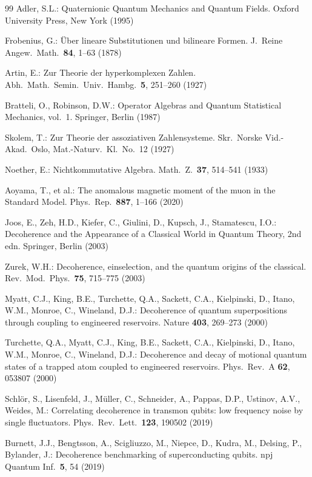 \documentclass[11pt]{article}
\theoremstyle{remark}
\begin{document}
\begin{thebibliography}{99}
 Adler, S.L.: Quaternionic Quantum Mechanics and Quantum Fields. Oxford University Press, New York (1995)

 Frobenius, G.: \"{U}ber lineare Substitutionen und bilineare Formen. J.\ Reine Angew.\ Math.\ \textbf{84}, 1--63 (1878)

 Artin, E.: Zur Theorie der hyperkomplexen Zahlen. Abh.\ Math.\ Semin.\ Univ.\ Hambg.\ \textbf{5}, 251--260 (1927)

 Bratteli, O., Robinson, D.W.: Operator Algebras and Quantum Statistical Mechanics, vol.~1. Springer, Berlin (1987)

 Skolem, T.: Zur Theorie der assoziativen Zahlensysteme. Skr.\ Norske Vid.-Akad.\ Oslo, Mat.-Naturv.\ Kl.\ No.~12 (1927)

 Noether, E.: Nichtkommutative Algebra. Math.\ Z.\ \textbf{37}, 514--541 (1933)

 Aoyama, T., et al.: The anomalous magnetic moment of the muon in the Standard Model. Phys.\ Rep.\ \textbf{887}, 1--166 (2020)

 Joos, E., Zeh, H.D., Kiefer, C., Giulini, D., Kupsch, J., Stamatescu, I.O.: Decoherence and the Appearance of a Classical World in Quantum Theory, 2nd edn. Springer, Berlin (2003)

 Zurek, W.H.: Decoherence, einselection, and the quantum origins of the classical. Rev.\ Mod.\ Phys.\ \textbf{75}, 715--775 (2003)

 Myatt, C.J., King, B.E., Turchette, Q.A., Sackett, C.A., Kielpinski, D., Itano, W.M., Monroe, C., Wineland, D.J.: Decoherence of quantum superpositions through coupling to engineered reservoirs. Nature \textbf{403}, 269--273 (2000)

 Turchette, Q.A., Myatt, C.J., King, B.E., Sackett, C.A., Kielpinski, D., Itano, W.M., Monroe, C., Wineland, D.J.: Decoherence and decay of motional quantum states of a trapped atom coupled to engineered reservoirs. Phys.\ Rev.\ A \textbf{62}, 053807 (2000)

 Schl\"or, S., Lisenfeld, J., M\"uller, C., Schneider, A., Pappas, D.P., Ustinov, A.V., Weides, M.: Correlating decoherence in transmon qubits: low frequency noise by single fluctuators. Phys.\ Rev.\ Lett.\ \textbf{123}, 190502 (2019)

 Burnett, J.J., Bengtsson, A., Scigliuzzo, M., Niepce, D., Kudra, M., Delsing, P., Bylander, J.: Decoherence benchmarking of superconducting qubits. npj Quantum Inf.\ \textbf{5}, 54 (2019)


\end{thebibliography}
\end{document}
